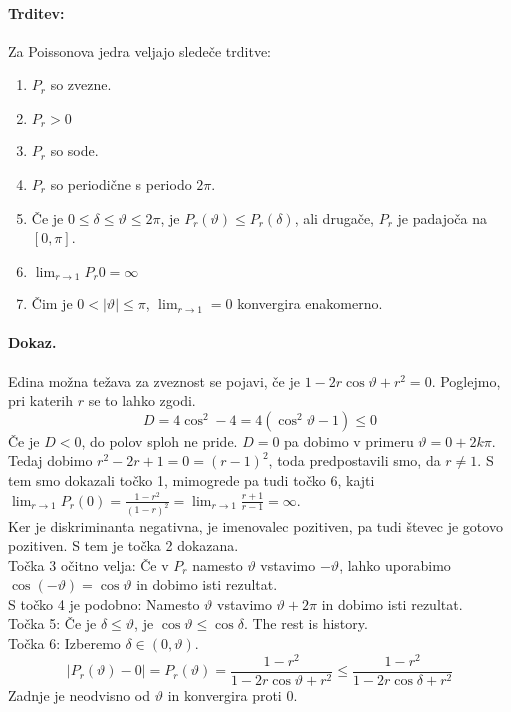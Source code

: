 \documentclass[a4paper]{article}
\begin{document}
\paragraph{Trditev:} Za Poissonova jedra veljajo sledeče trditve:
\begin{enumerate}
    \item $P_r$ so zvezne.
    \item $P_r > 0$
    \item $P_r$ so sode.
    \item $P_r$ so periodične s periodo $2\pi$.
    \item Če je $0\leq\delta\leq\vartheta\leq2\pi$, je $P_r(\vartheta)\leq P_r(\delta)$, ali drugače, $P_r$ je padajoča na $[0, \pi]$.
    \item $\lim_{r \to 1} P_r{0} = \infty$
    \item Čim je $0 < |\vartheta| \leq \pi$, $\lim_{r \to 1}=0$ konvergira enakomerno.
\end{enumerate}
\paragraph{Dokaz.} Edina možna težava za zveznost se pojavi, če je $1 - 2r\cos\vartheta + r^2 = 0$. Poglejmo, pri katerih $r$ se to lahko zgodi.
$$D = 4\cos^2 - 4 = 4(\cos^2\vartheta - 1) \leq 0$$
Če je $D<0$, do polov sploh ne pride. $D=0$ pa dobimo v primeru $\vartheta = 0 + 2k\pi$. Tedaj dobimo $r^2 - 2r + 1 = 0 = (r-1)^2$, toda predpostavili smo, da $r\neq1$. S tem smo dokazali točko 1,
mimogrede pa tudi točko 6, kajti $\displaystyle{\lim_{r \to 1}P_r(0) = \frac{1 - r^2}{(1 - r)^2} = \lim_{r\to1}\frac{r+1}{r-1} = \infty}$. \\
Ker je diskriminanta negativna, je imenovalec pozitiven, pa tudi števec je gotovo pozitiven. S tem je točka 2 dokazana. \\
Točka 3 očitno velja: Če v $P_r$ namesto $\vartheta$ vstavimo $-\vartheta$, lahko uporabimo $\cos(-\vartheta) = \cos\vartheta$ in dobimo isti rezultat. \\
S točko 4 je podobno: Namesto $\vartheta$ vstavimo $\vartheta + 2\pi$ in dobimo isti rezultat. \\
Točka 5: Če je $\delta \leq \vartheta$, je $\cos\vartheta \leq \cos\delta$. The rest is history. \\
Točka 6: Izberemo $\delta \in (0,\vartheta)$. $$|P_r(\vartheta) - 0| = P_r(\vartheta) = \frac{1-r^2}{1 - 2r\cos\vartheta + r^2} \leq \frac{1-r^2}{1 - 2r\cos\delta + r^2}$$
Zadnje je neodvisno od $\vartheta$ in konvergira proti 0.
\end{document}
